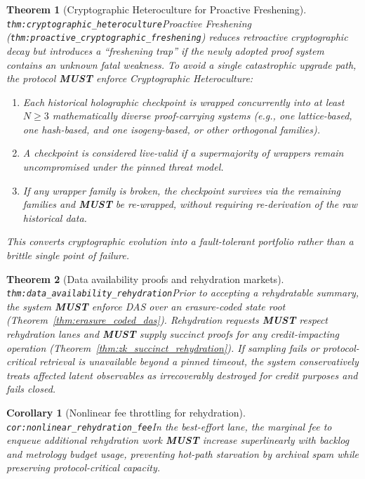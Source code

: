 \documentclass[11pt]{article}
\theoremstyle{definition}
\theoremstyle{plain}
\newtheorem{theorem}{Theorem}
\newtheorem{corollary}{Corollary}
\newcommand{\MUST}{\textbf{MUST}}
\newcommand{\lbl}[1]{\texttt{\footnotesize\nolinkurl{#1}}}
\newcommand{\DefLabel}[1]{\hfill{\small\lbl{#1}}}
\begin{document}
\begin{theorem}[Cryptographic Heteroculture for Proactive Freshening]\DefLabel{thm:cryptographic_heteroculture}\label{thm:cryptographic_heteroculture}
Proactive Freshening (\lbl{thm:proactive_cryptographic_freshening}) reduces retroactive cryptographic decay but introduces a ``freshening trap'' if the newly adopted proof system contains an unknown fatal weakness.
To avoid a single catastrophic upgrade path, the protocol \MUST{} enforce \emph{Cryptographic Heteroculture}:
\begin{enumerate}
\item Each historical holographic checkpoint is wrapped concurrently into at least $N\ge 3$ mathematically diverse proof-carrying systems (e.g., one lattice-based, one hash-based, and one isogeny-based, or other orthogonal families).
\item A checkpoint is considered \emph{live-valid} if a supermajority of wrappers remain uncompromised under the pinned threat model.
\item If any wrapper family is broken, the checkpoint survives via the remaining families and \MUST{} be re-wrapped, without requiring re-derivation of the raw historical data.
\end{enumerate}
This converts cryptographic evolution into a fault-tolerant portfolio rather than a brittle single point of failure.
\end{theorem}

\begin{theorem}[Data availability proofs and rehydration markets]\DefLabel{thm:data_availability_rehydration}\label{thm:data_availability_rehydration}
Prior to accepting a rehydratable summary, the system \MUST{} enforce DAS over an erasure-coded state root (Theorem~\ref{thm:erasure_coded_das}).
Rehydration requests \MUST{} respect rehydration lanes and \MUST{} supply succinct proofs for any credit-impacting operation (Theorem~\ref{thm:zk_succinct_rehydration}).
If sampling fails or protocol-critical retrieval is unavailable beyond a pinned timeout, the system conservatively treats affected latent observables as irrecoverably destroyed for credit purposes and fails closed.
\end{theorem}

\begin{corollary}[Nonlinear fee throttling for rehydration]\DefLabel{cor:nonlinear_rehydration_fee}\label{cor:nonlinear_rehydration_fee}
In the best-effort lane, the marginal fee to enqueue additional rehydration work \MUST{} increase superlinearly with backlog and metrology budget usage, preventing hot-path starvation by archival spam while preserving protocol-critical capacity.
\end{corollary}
\end{document}
